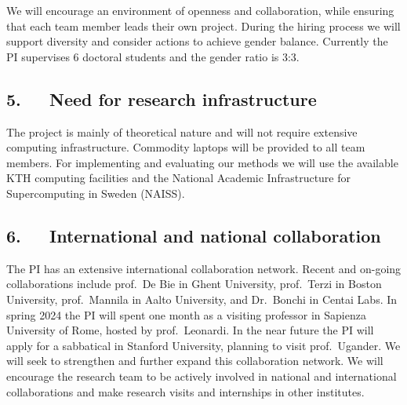 \documentclass[a4paper,11pt]{article}
\begin{document}
We will encourage an environment of openness and collaboration, 
while ensuring that each team member leads their own project.
%
During the hiring process we will support diversity and consider actions to achieve gender balance. 
Currently the PI supervises 6 doctoral students and the gender ratio is 3:3.

\vspace{-2mm}
\subsection*{5.~~~Need for research infrastructure}
\vspace{-1mm}


The project is mainly of theoretical nature and will not require extensive computing infrastructure. 
Commodity laptops will be provided to all team members. 
For implementing and evaluating our methods we will use the available 
KTH computing facilities
and the National Academic Infrastructure for Supercomputing in Sweden (NAISS).

\vspace{-2mm}
\subsection*{6.~~~International and national collaboration}
\vspace{-1mm}


The PI has an extensive international collaboration network. 
Recent and on-going collaborations include
prof.\ De Bie in Ghent University, 
prof.\ Terzi in Boston University,
prof.\ Mannila in Aalto University, and 
Dr.\ Bonchi in Centai Labs.
In spring 2024 the PI will spent one month as a visiting professor 
in Sapienza University of Rome, hosted by prof.\ Leonardi.
In the near future the PI will apply for a sabbatical in Stanford University, 
planning to visit prof.\ Ugander. 
We will seek to strengthen and further expand this collaboration network.
We will encourage the research team to be actively involved in national and international collaborations
and make research visits and internships in other institutes.

\vspace{-3mm}
{\footnotesize
\setlength{\bibsep}{0pt}


}

% 
\end{document}

